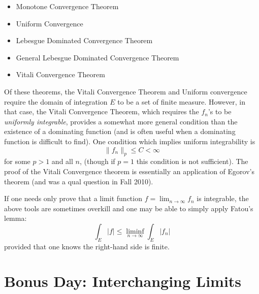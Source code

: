 \documentclass{exam}
\theoremstyle{problemstyle}
\newcommand{\1}[1]{\textbf{1}_{\left[#1\right]}} %
\begin{document}
\begin{questions}
\begin{itemize}
  \item Monotone Convergence Theorem
  \item Uniform Convergence
  \item Lebesgue Dominated Convergence Theorem
  \item General Lebesgue Dominated Convergence Theorem
  \item Vitali Convergence Theorem
\end{itemize}

Of these theorems, the Vitali Convergence Theorem and Uniform convergence
require the domain of integration $E$ to be a set of finite measure. However, in that case, the Vitali
Convergence Theorem, which requires the $f_{n}$'s to be \textit{uniformly integrable}, provides a somewhat more general condition than the existence of a dominating function (and is often useful when a dominating function is difficult to find).
One condition which implies uniform integrability is 
\begin{equation*}
  \|f_{n}\|_{p}\leq C <\infty
\end{equation*}
for some $p>1$ and all $n$, (though if $p=1$ this condition is not sufficient). The proof of the Vitali Convergence theorem is essentially an application of Egorov's theorem (and was a qual question in Fall 2010).

If one needs only prove that a limit function $f = \lim_{n\to\infty} f_n$ is integrable, the above tools are sometimes overkill and one may be able to simply apply Fatou's lemma:
\begin{equation*}
  \int_{E} |f| \leq  \liminf_{n\to\infty}\int_{E} |f_{n}|
\end{equation*}
provided that one knows the right-hand side is finite.






\newpage
\section{Bonus Day: Interchanging Limits}


\end{questions}
\end{document}
